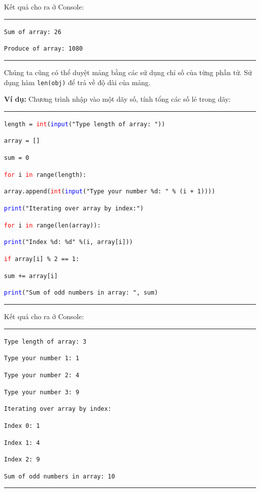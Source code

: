 \noindent
\resetlinenumber
Kết quả cho ra ở Console:\\
\rule{\linewidth}{0.2mm}\par
\begin{linenumbers}
	\texttt{Sum of array:  26}\par
	\texttt{Produce of array:  1080}\par
\end{linenumbers}
\rule{\linewidth}{0.2mm}\par
\resetlinenumber
\newpage
Chúng ta cũng có thể duyệt mảng bằng các sử dụng chỉ số của từng phần tử. Sử dụng hàm \texttt{len(obj)} để trả về độ dài của mảng.\par
\noindent
\textbf{Ví dụ:} Chương trình nhập vào một dãy số, tính tổng các số lẻ trong dãy:\\
\rule{\linewidth}{0.2mm}\par
\begin{linenumbers}
	\texttt{length = \textcolor{red}{int}(\textcolor{blue}{input}("Type length of array: "))}\par
	\texttt{array = []}\par
	\texttt{sum = 0}\par
	\texttt{\textcolor{red}{for} i \textcolor{red}{in} range(length):}\par
	\qquad \texttt{array.append(\textcolor{red}{int}(\textcolor{blue}{input}("Type your number \%d: " \% (i + 1))))}\par
	\texttt{\textcolor{blue}{print}("Iterating over array by index:")}\par
	\texttt{\textcolor{red}{for} i \textcolor{red}{in} range(len(array)):}\par
	\qquad \texttt{\textcolor{blue}{print}("Index \%d: \%d" \%(i, array[i]))}\par
	\qquad \texttt{\textcolor{red}{if} array[i] \% 2 == 1:}\par
	\qquad \qquad \texttt{sum += array[i]}\par
	\texttt{\textcolor{blue}{print}("Sum of odd numbers in array: ", sum)}\par
\end{linenumbers}
\rule{\linewidth}{0.2mm}\par
\noindent
\resetlinenumber
Kết quả cho ra ở Console:\\
\rule{\linewidth}{0.2mm}\par
\begin{linenumbers}
	\texttt{Type length of array: 3}\par
	\texttt{Type your number 1: 1}\par
	\texttt{Type your number 2: 4}\par
	\texttt{Type your number 3: 9}\par
	\texttt{Iterating over array by index:}\par
	\texttt{Index 0: 1}\par
	\texttt{Index 1: 4}\par
	\texttt{Index 2: 9}\par
	\texttt{Sum of odd numbers in array:  10}
\end{linenumbers}
\rule{\linewidth}{0.2mm}\par
\resetlinenumber
\newpage